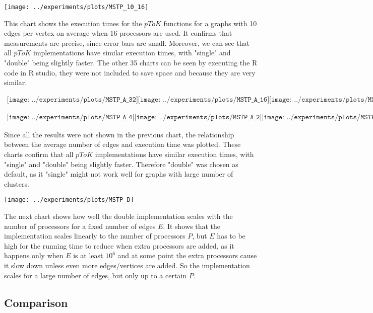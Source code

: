\documentclass{report}
\theoremstyle{plain}
\theoremstyle{definition}
\theoremstyle{remark}
\begin{document}
\texttt{[image: ../experiments/plots/MSTP\_10\_16]}

This chart shows the execution times for the $pToK$ functions for a graphs with 10 edges per vertex on average when 16 processors are used. It confirms that measurements are precise, since error bars are small. Moreover, we can see that all $pToK$ implementations have similar execution times, with "single" and "double" being slightly faster. The other 35 charts can be seen by executing the R code in R studio, they were not included to save space and because they are very similar.

\begin{center}
$
\begin{array}{cc}
\texttt{[image: ../experiments/plots/MSTP\_A\_32]}
\texttt{[image: ../experiments/plots/MSTP\_A\_16]}
\texttt{[image: ../experiments/plots/MSTP\_A\_8]}
\end{array}
$

\center
$
\begin{array}{cc}
\texttt{[image: ../experiments/plots/MSTP\_A\_4]}
\texttt{[image: ../experiments/plots/MSTP\_A\_2]}
\texttt{[image: ../experiments/plots/MSTP\_A\_1]}
\end{array}
$
\end{center}

Since all the results were not shown in the previous chart, the relationship between the average number of edges and execution time was plotted. These charts confirm that all $pToK$ implementations have similar execution times, with "single" and "double" being slightly faster. Therefore "double" was chosen as default, as it "single" might not work well for graphs with large number of clusters.

\texttt{[image: ../experiments/plots/MSTP\_D]}

The next chart shows how well the double implementation scales with the number of processors for a fixed number of edges $E$. It shows that the implementation scales linearly to the number of processors $P$, but $E$ has to be high for the running time to reduce when extra processors are added, as it happens only when $E$ is at least $10^6$ and at some point the extra processors cause it slow down unless even more edges/vertices are added. So the implementation scales for a large number of edges, but only up to a certain $P$.

\subsection{Comparison}
\end{document}
